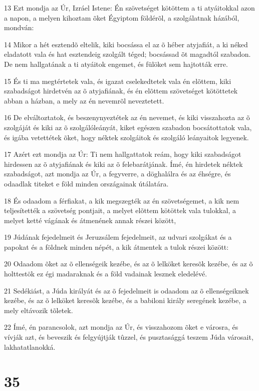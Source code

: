 \par 13 Ezt mondja az Úr, Izráel Istene: Én szövetséget kötöttem a ti atyáitokkal azon a napon, a melyen kihoztam õket Égyiptom földérõl, a szolgálatnak házából, mondván:
\par 14 Mikor a hét esztendõ eltelik, kiki bocsássa el az õ héber atyjafiát, a ki néked eladatott vala és hat esztendeig szolgált téged; bocsássad õt magadtól szabadon. De nem hallgatának a ti atyáitok engemet, és fülöket sem hajtották erre.
\par 15 És ti ma megtértetek vala, és igazat cselekedtetek vala én elõttem, kiki szabadságot hirdetvén az õ atyjafiának, és én elõttem szövetséget kötöttetek abban a házban, a mely az én nevemrõl neveztetett.
\par 16 De elváltoztatok, és beszenynyeztétek az én nevemet, és kiki visszahozta az õ szolgáját és kiki az õ szolgálóleányát, kiket egészen szabadon bocsátottatok vala, és igába vetettétek õket, hogy néktek szolgáitok és szolgáló leányaitok legyenek.
\par 17 Azért ezt mondja az Úr: Ti nem hallgattatok reám, hogy kiki szabadságot hirdessen az õ atyjafiának és kiki az õ felebarátjának. Ímé, én hirdetek néktek szabadságot, azt mondja az Úr, a fegyverre, a döghalálra és az éhségre, és odaadlak titeket e föld minden országainak útálatára.
\par 18 És odaadom a férfiakat, a kik megszegték az én szövetségemet, a kik nem teljesítették a szövetség pontjait, a melyet elõttem kötöttek vala tulokkal, a melyet ketté vágának és átmenének annak részei között,
\par 19 Júdának fejedelmeit és Jeruzsálem fejedelmeit, az udvari szolgákat és a papokat és a földnek minden népét, a kik átmentek a tulok részei között:
\par 20 Odaadom õket az õ ellenségeik kezébe, és az õ lelköket keresõk kezébe, és az õ holttestök ez égi madaraknak és a föld vadainak lesznek eledelévé.
\par 21 Sedékiást, a Júda királyát és az õ fejedelmeit is odaadom az õ ellenségeiknek kezébe, és az õ lelköket keresõk kezébe, és a babiloni király seregének kezébe, a mely  eltávozik tõletek.
\par 22 Ímé, én parancsolok, azt mondja az Úr, és visszahozom õket e városra, és vívják azt, és beveszik és felgyújtják tûzzel, és pusztasággá teszem Júda városait, lakhatatlanokká.

\chapter{35}

